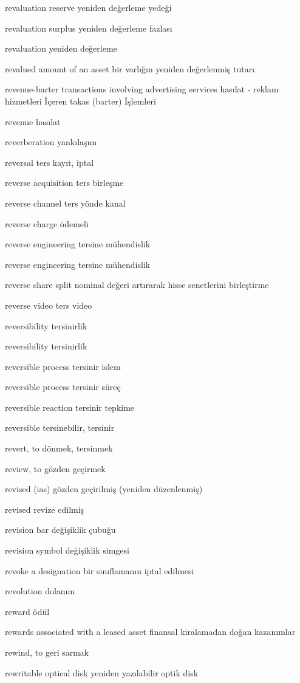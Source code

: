 \documentclass[12pt,fleqn]{article}\usepackage{../../common}
\begin{document}
revaluation reserve yeniden değerleme yedeği

revaluation surplus yeniden değerleme fazlası

revaluation yeniden değerleme

revalued amount of an asset bir varlığın yeniden değerlenmiş tutarı

revenue-barter transactions involving advertising services hasılat - reklam hizmetleri İçeren takas (barter) İşlemleri

revenue hasılat

reverberation yankılaşım

reversal ters kayıt, iptal

reverse acquisition ters birleşme

reverse channel ters yönde kanal

reverse charge ödemeli

reverse engineering tersine mühendislik

reverse engineering tersine mühendislik

reverse share split nominal değeri artırarak hisse senetlerini birleştirme

reverse video ters video

reversibility tersinirlik

reversibility tersinirlik

reversible process tersinir islem

reversible process tersinir süreç

reversible reaction tersinir tepkime

reversible tersinebilir, tersinir

revert, to dönmek, tersinmek

review, to gözden geçirmek

revised (ias) gözden geçirilmiş (yeniden düzenlenmiş)

revised revize edilmiş

revision bar değişiklik çubuğu

revision symbol değişiklik simgesi

revoke a designation bir sınıflamanın iptal edilmesi

revolution dolanım

reward ödül

rewards associated with a leased asset finansal kiralamadan doğan kazanımlar

rewind, to geri sarmak

rewritable optical disk yeniden yazılabilir optik disk
\end{document}
